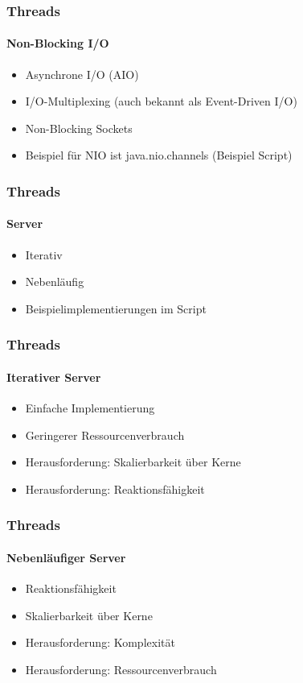 \begin{frame}
  \frametitle{Threads}
  \framesubtitle{Non-Blocking I/O}
  \begin{itemize}
    \item Asynchrone I/O (AIO)
    \item I/O-Multiplexing (auch bekannt als Event-Driven I/O)
    \item Non-Blocking Sockets
    \item Beispiel für NIO ist java.nio.channels (Beispiel Script)
  \end{itemize}
\end{frame}

\begin{frame}
  \frametitle{Threads}
  \framesubtitle{Server}
  \begin{itemize}
    \item Iterativ
    \item Nebenläufig
    \item Beispielimplementierungen im Script
  \end{itemize}
\end{frame}

\begin{frame}
  \frametitle{Threads}
  \framesubtitle{Iterativer Server}
  \begin{itemize}
    \item Einfache Implementierung
    \item Geringerer Ressourcenverbrauch
    \item Herausforderung: Skalierbarkeit über Kerne
    \item Herausforderung: Reaktionsfähigkeit
  \end{itemize}
\end{frame}

\begin{frame}
  \frametitle{Threads}
  \framesubtitle{Nebenläufiger Server}
  \begin{itemize}
    \item Reaktionsfähigkeit
    \item Skalierbarkeit über Kerne
    \item Herausforderung: Komplexität
    \item Herausforderung: Ressourcenverbrauch
  \end{itemize}
\end{frame}
